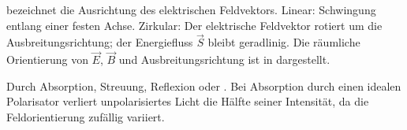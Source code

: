 \begin{statementbox}
 bezeichnet die Ausrichtung des elektrischen Feldvektors. Linear: Schwingung entlang einer festen Achse. Zirkular: Der elektrische Feldvektor rotiert um die Ausbreitungsrichtung; der Energiefluss $\vec{S}$ bleibt geradlinig. Die räumliche Orientierung von $\vec{E}$, $\vec{B}$ und Ausbreitungsrichtung ist in  dargestellt.
\end{statementbox}
\begin{statementbox}
Durch Absorption, Streuung, Reflexion oder . Bei Absorption durch einen idealen Polarisator verliert unpolarisiertes Licht die Hälfte seiner Intensität, da die Feldorientierung zufällig variiert.
\end{statementbox}





